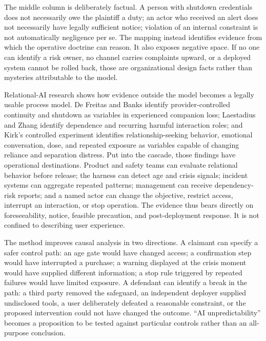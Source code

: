 The middle column is deliberately factual. A person with shutdown credentials does not necessarily owe the plaintiff a duty; an actor who received an alert does not necessarily have legally sufficient notice; violation of an internal constraint is not automatically negligence per se. The mapping instead identifies evidence from which the operative doctrine can reason. It also exposes negative space. If no one can identify a risk owner, no channel carries complaints upward, or a deployed system cannot be rolled back, those are organizational design facts rather than mysteries attributable to the model.

Relational-AI research shows how evidence outside the model becomes a legally usable process model. De Freitas and Banks identify provider-controlled continuity and shutdown as variables in experienced companion loss; Laestadius and Zhang identify dependence and recurring harmful interaction roles; and Kirk's controlled experiment identifies relationship-seeking behavior, emotional conversation, dose, and repeated exposure as variables capable of changing reliance and separation distress. Put into the cascade, those findings have operational destinations. Product and safety teams can evaluate relational behavior before release; the harness can detect age and crisis signals; incident systems can aggregate repeated patterns; management can receive dependency-risk reports; and a named actor can change the objective, restrict access, interrupt an interaction, or stop operation. The evidence thus bears directly on foreseeability, notice, feasible precaution, and post-deployment response. It is not confined to describing user experience.

The method improves causal analysis in two directions. A claimant can specify a safer control path: an age gate would have changed access; a confirmation step would have interrupted a purchase; a warning displayed at the crisis moment would have supplied different information; a stop rule triggered by repeated failures would have limited exposure. A defendant can identify a break in the path: a third party removed the safeguard, an independent deployer supplied undisclosed tools, a user deliberately defeated a reasonable constraint, or the proposed intervention could not have changed the outcome. ``AI unpredictability'' becomes a proposition to be tested against particular controls rather than an all-purpose conclusion.

